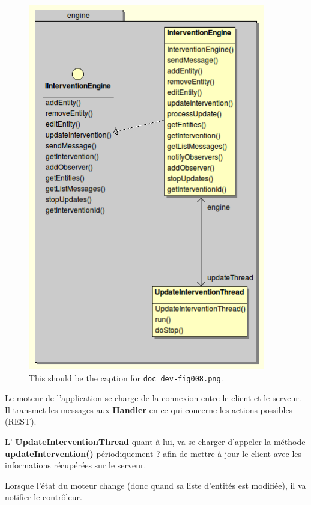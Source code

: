 \documentclass{article}
\begin{document}
\begin{figure}[htbp]
\begin{center}
\includegraphics[width=293pt, height=456pt]{doc_dev-fig008.png}
\caption{This should be the caption for \texttt{doc\_dev-fig008.png}.}
\end{center}
\end{figure}

\vspace{13pt}
{\color{color01} Le moteur de l'application se charge de la connexion entre le 
client et le serveur. Il transmet les messages aux }{\color{color01} \textbf{Handler}}{\color{color01}  
en ce qui concerne les actions possibles (REST).}

{\color{color01} L'}{\color{color01} \textbf{UpdateInterventionThread}}{\color{color01}  
quant à lui, va se charger d'appeler la méthode }{\color{color01} \textbf{updateIntervention()}}{\color{color01}  
périodiquement ? afin de mettre à jour le client avec les informations récupérées 
sur le serveur.}

{\color{color01} Lorsque l'état du moteur change (donc quand sa liste d'entités 
est modifiée), il va notifier le contrôleur.}
\end{document}
